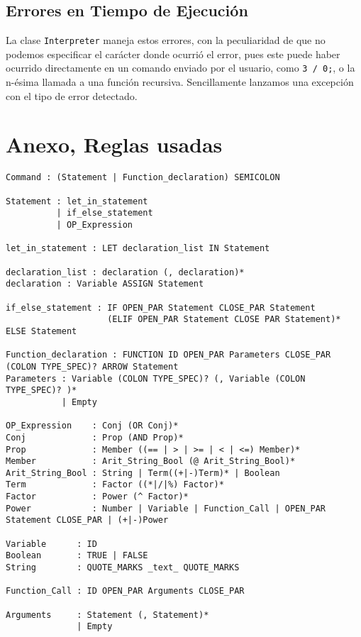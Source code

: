 \documentclass{article}
\begin{document}
\subsection{Errores en Tiempo de Ejecución}
La clase \texttt{Interpreter} maneja estos errores, con la peculiaridad de que no podemos especificar el carácter donde ocurrió el error, pues este puede haber ocurrido directamente en un comando enviado por el usuario, como \texttt{3 / 0;}, o la n-ésima llamada a una función recursiva. Sencillamente lanzamos una excepción con el tipo de error detectado.

\newpage

\section{Anexo, Reglas usadas}

\begin{verbatim}
Command : (Statement | Function_declaration) SEMICOLON

Statement : let_in_statement
          | if_else_statement
          | OP_Expression

let_in_statement : LET declaration_list IN Statement

declaration_list : declaration (, declaration)*
declaration : Variable ASSIGN Statement

if_else_statement : IF OPEN_PAR Statement CLOSE_PAR Statement 
                    (ELIF OPEN_PAR Statement CLOSE PAR Statement)* ELSE Statement

Function_declaration : FUNCTION ID OPEN_PAR Parameters CLOSE_PAR (COLON TYPE_SPEC)? ARROW Statement
Parameters : Variable (COLON TYPE_SPEC)? (, Variable (COLON TYPE_SPEC)? )*
           | Empty

OP_Expression    : Conj (OR Conj)*
Conj             : Prop (AND Prop)*
Prop             : Member ((== | > | >= | < | <=) Member)*
Member           : Arit_String_Bool (@ Arit_String_Bool)*
Arit_String_Bool : String | Term((+|-)Term)* | Boolean
Term             : Factor ((*|/|%) Factor)*
Factor           : Power (^ Factor)*
Power            : Number | Variable | Function_Call | OPEN_PAR Statement CLOSE_PAR | (+|-)Power

Variable      : ID
Boolean       : TRUE | FALSE
String        : QUOTE_MARKS _text_ QUOTE_MARKS

Function_Call : ID OPEN_PAR Arguments CLOSE_PAR

Arguments     : Statement (, Statement)*
              | Empty
\end{verbatim}
\end{document}
